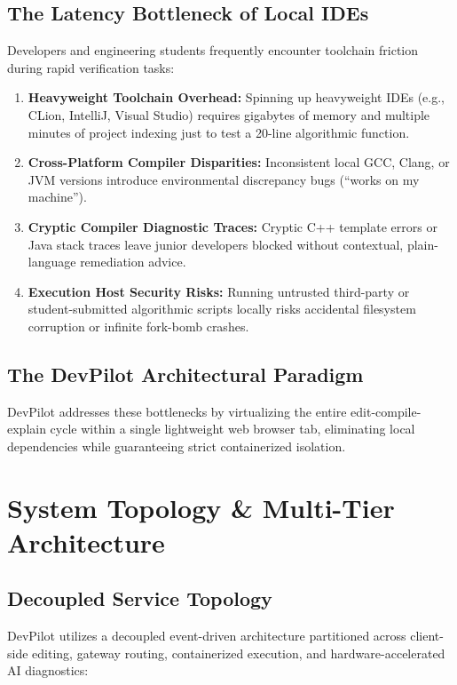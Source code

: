 \documentclass[12pt,a4paper]{report}
\begin{document}
\section{The Latency Bottleneck of Local IDEs}
Developers and engineering students frequently encounter toolchain friction during rapid verification tasks:
\begin{enumerate}[nosep]
    \item \textbf{Heavyweight Toolchain Overhead:} Spinning up heavyweight IDEs (e.g., CLion, IntelliJ, Visual Studio) requires gigabytes of memory and multiple minutes of project indexing just to test a 20-line algorithmic function.
    \item \textbf{Cross-Platform Compiler Disparities:} Inconsistent local GCC, Clang, or JVM versions introduce environmental discrepancy bugs (``works on my machine'').
    \item \textbf{Cryptic Compiler Diagnostic Traces:} Cryptic C++ template errors or Java stack traces leave junior developers blocked without contextual, plain-language remediation advice.
    \item \textbf{Execution Host Security Risks:} Running untrusted third-party or student-submitted algorithmic scripts locally risks accidental filesystem corruption or infinite fork-bomb crashes.
\end{enumerate}

\section{The DevPilot Architectural Paradigm}
DevPilot addresses these bottlenecks by virtualizing the entire edit-compile-explain cycle within a single lightweight web browser tab, eliminating local dependencies while guaranteeing strict containerized isolation.

\chapter{System Topology \& Multi-Tier Architecture}

\section{Decoupled Service Topology}
DevPilot utilizes a decoupled event-driven architecture partitioned across client-side editing, gateway routing, containerized execution, and hardware-accelerated AI diagnostics:
\end{document}
